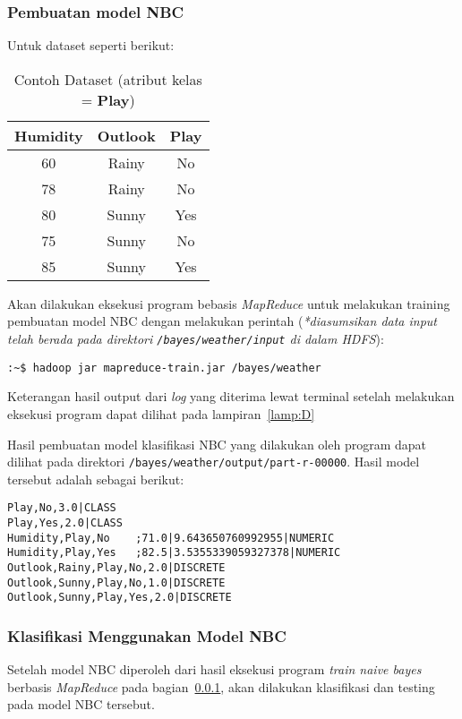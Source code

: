 \subsubsection{Pembuatan model NBC}
\label{subsubsec:Pembuatan model naive bayes classifier}

Untuk dataset seperti berikut:
\begin{table}[H]
\label{tab:dataset-pl}
\centering
\caption{Contoh Dataset (atribut kelas = \textbf{Play})}
\begin{tabular}{ | c | c | c | }
\hline
	Humidity & Outlook & \textbf{Play}\\ \hline \hline
60 & Rainy & No\\ \hline
78 & Rainy & No\\ \hline
80 & Sunny & Yes\\ \hline
75 & Sunny & No\\ \hline
85 & Sunny & Yes \\ \hline
\end{tabular}
\end{table}

Akan dilakukan eksekusi program bebasis \textit{MapReduce} untuk melakukan training pembuatan model NBC dengan melakukan perintah (\textit{*diasumsikan data input telah berada pada direktori \texttt{/bayes/weather/input} di dalam HDFS}):
\begin{lstlisting}
:~$ hadoop jar mapreduce-train.jar /bayes/weather
\end{lstlisting}

Keterangan hasil output dari \textit{log} yang diterima lewat terminal setelah melakukan eksekusi program dapat dilihat pada lampiran~\ref{lamp:D}

Hasil pembuatan model klasifikasi NBC yang dilakukan oleh program dapat dilihat pada direktori \texttt{/bayes/weather/output/part-r-00000}. Hasil model tersebut adalah sebagai berikut:
\begin{lstlisting}
Play,No,3.0|CLASS	
Play,Yes,2.0|CLASS	
Humidity,Play,No	;71.0|9.643650760992955|NUMERIC
Humidity,Play,Yes	;82.5|3.5355339059327378|NUMERIC
Outlook,Rainy,Play,No,2.0|DISCRETE	
Outlook,Sunny,Play,No,1.0|DISCRETE	
Outlook,Sunny,Play,Yes,2.0|DISCRETE
\end{lstlisting}

\subsubsection{Klasifikasi Menggunakan Model NBC}
Setelah model NBC diperoleh dari hasil eksekusi program \textit{train naive bayes} berbasis \textit{MapReduce} pada bagian~\ref{subsubsec:Pembuatan model naive bayes classifier}, akan dilakukan klasifikasi dan testing pada model NBC tersebut.

